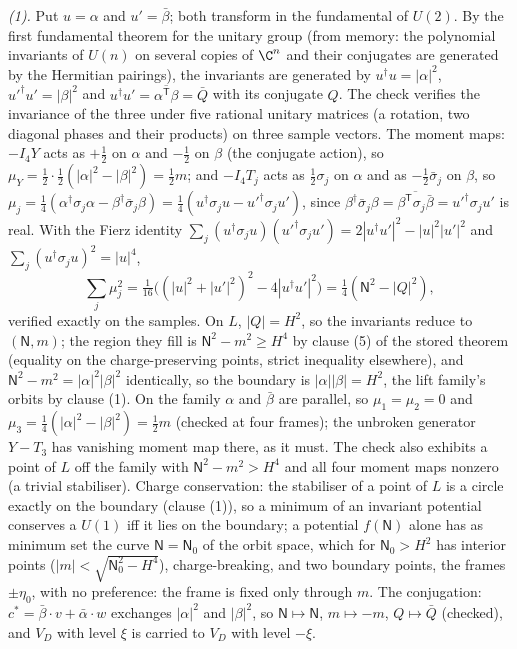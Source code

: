 \emph{(1).} Put $u = \alpha$ and $u' = \bar{\beta}$; both transform in the fundamental of $U(2)$. By the first fundamental theorem for the unitary group (from memory: the polynomial invariants of $U(n)$ on several copies of $\C^{n}$ and their conjugates are generated by the Hermitian pairings), the invariants are generated by $u^{\dagger}u = |\alpha|^{2}$, $u'^{\dagger}u' = |\beta|^{2}$ and $u^{\dagger}u' = \overline{\alpha^{\mathsf T}\beta} = \bar{Q}$ with its conjugate $Q$. The check verifies the invariance of the three under five rational unitary matrices (a rotation, two diagonal phases and their products) on three sample vectors. The moment maps: $-I_{4}Y$ acts as $+\tfrac12$ on $\alpha$ and $-\tfrac12$ on $\beta$ (the conjugate action), so $\mu_{Y} = \tfrac12\cdot\tfrac12(|\alpha|^{2} - |\beta|^{2}) = \tfrac12 m$; and $-I_{4}T_{j}$ acts as $\tfrac12\sigma_{j}$ on $\alpha$ and as $-\tfrac12\bar{\sigma}_{j}$ on $\beta$, so $\mu_{j} = \tfrac14(\alpha^{\dagger}\sigma_{j}\alpha - \beta^{\dagger}\bar{\sigma}_{j}\beta) = \tfrac14(u^{\dagger}\sigma_{j}u - u'^{\dagger}\sigma_{j}u')$, since $\beta^{\dagger}\bar{\sigma}_{j}\beta = \overline{\beta^{\mathsf T}\sigma_{j}\bar{\beta}} = u'^{\dagger}\sigma_{j}u'$ is real. With the Fierz identity $\sum_{j}(u^{\dagger}\sigma_{j}u)(u'^{\dagger}\sigma_{j}u') = 2|u^{\dagger}u'|^{2} - |u|^{2}|u'|^{2}$ and $\sum_{j}(u^{\dagger}\sigma_{j}u)^{2} = |u|^{4}$,
\[
\sum_{j}\mu_{j}^{2} = \tfrac{1}{16}\bigl((|u|^{2} + |u'|^{2})^{2} - 4|u^{\dagger}u'|^{2}\bigr) = \tfrac14(\mathsf{N}^{2} - |Q|^{2}),
\]
verified exactly on the samples. On $L$, $|Q| = H^{2}$, so the invariants reduce to $(\mathsf{N}, m)$; the region they fill is $\mathsf{N}^{2} - m^{2} \ge H^{4}$ by clause (5) of the stored theorem (equality on the charge-preserving points, strict inequality elsewhere), and $\mathsf{N}^{2} - m^{2} = |\alpha|^{2}|\beta|^{2}$ identically, so the boundary is $|\alpha||\beta| = H^{2}$, the lift family's orbits by clause (1). On the family $\alpha$ and $\bar{\beta}$ are parallel, so $\mu_{1} = \mu_{2} = 0$ and $\mu_{3} = \tfrac14(|\alpha|^{2} - |\beta|^{2}) = \tfrac12 m$ (checked at four frames); the unbroken generator $Y - T_{3}$ has vanishing moment map there, as it must. The check also exhibits a point of $L$ off the family with $\mathsf{N}^{2} - m^{2} > H^{4}$ and all four moment maps nonzero (a trivial stabiliser). Charge conservation: the stabiliser of a point of $L$ is a circle exactly on the boundary (clause (1)), so a minimum of an invariant potential conserves a $U(1)$ iff it lies on the boundary; a potential $f(\mathsf{N})$ alone has as minimum set the curve $\mathsf{N} = \mathsf{N}_{0}$ of the orbit space, which for $\mathsf{N}_{0} > H^{2}$ has interior points ($|m| < \sqrt{\mathsf{N}_{0}^{2} - H^{4}}$), charge-breaking, and two boundary points, the frames $\pm\eta_{0}$, with no preference: the frame is fixed only through $m$. The conjugation: $c^{*} = \bar{\beta}\cdot v + \bar{\alpha}\cdot w$ exchanges $|\alpha|^{2}$ and $|\beta|^{2}$, so $\mathsf{N} \mapsto \mathsf{N}$, $m \mapsto -m$, $Q \mapsto \bar{Q}$ (checked), and $V_{D}$ with level $\xi$ is carried to $V_{D}$ with level $-\xi$.


